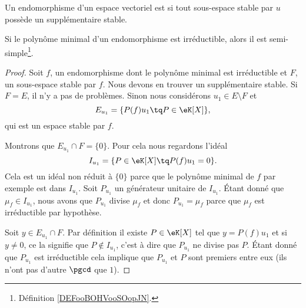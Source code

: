 \begin{definition}  \label{DEFooBOHVooSOopJN}
    Un endomorphisme d'un espace vectoriel est  si tout sous-espace stable par \( u\) possède un supplémentaire stable.
\end{definition}

\begin{lemma}   \label{LemrFINYT}
    Si le polynôme minimal d'un endomorphisme est irréductible, alors il est semi-simple\footnote{Définition \ref{DEFooBOHVooSOopJN}.}.
\end{lemma}

\begin{proof}
    Soit \( f\), un endomorphisme dont le polynôme minimal est irréductible et \( F\), un sous-espace stable par \( f\). Nous devons en trouver un supplémentaire stable. Si \( F=E\), il n'y a pas de problèmes. Sinon nous considérons \( u_1\in E\setminus F\) et
    \begin{equation}
        E_{u_1}=\{ P(f)u_1\tq P\in \eK[X] \},
    \end{equation}
    qui est un espace stable par \( f\). 

    Montrons que \( E_{u_1}\cap F=\{ 0 \}\). Pour cela nous regardons l'idéal
    \begin{equation}
        I_{u_1}=\{ P\in \eK[X]\tq P(f)u_1=0 \}.
    \end{equation}
    Cela est un idéal non réduit à \( \{ 0 \}\) parce que le polynôme minimal de \( f\) par exemple est dans \( I_{u_1}\). Soit \( P_{u_1}\) un générateur unitaire de \( I_{u_1}\). Étant donné que \( \mu_f\in I_{u_1}\), nous avons que \( P_{u_1}\) divise \( \mu_f\) et donc \( P_{u_1}=\mu_f\) parce que \( \mu_f\) est irréductible par hypothèse.

    Soit \( y\in E_{u_1}\cap F\). Par définition il existe \( P\in\eK[X]\) tel que \( y=P(f)u_1\) et si \( y\neq 0\), ce la signifie que \( P\notin I_{u_1}\), c'est à dire que \( P_{u_1} \) ne divise pas \( P\). Étant donné que \( P_{u_1}\) est irréductible cela implique que \( P_{u_1}\) et \( P\) sont premiers entre eux (ils n'ont pas d'autre \( \pgcd\) que \( 1\)).


\end{proof}
